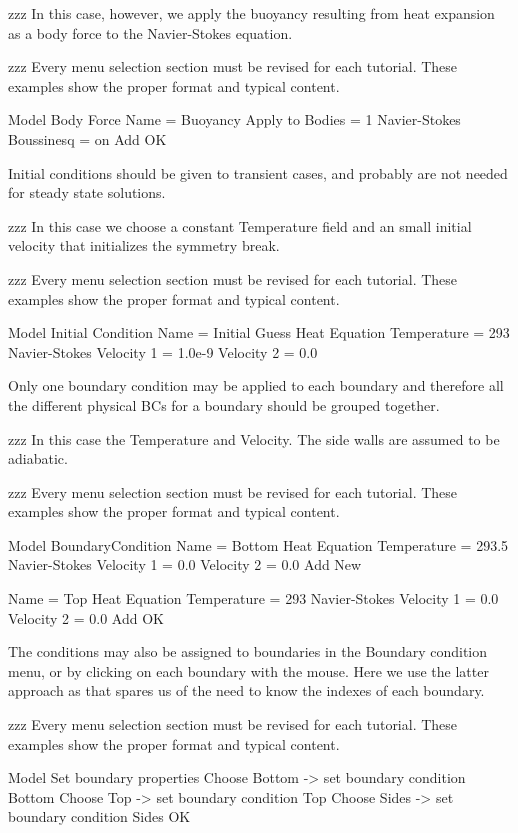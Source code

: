 zzz In this case, however, we apply the buoyancy resulting from heat expansion as a body force to the Navier-Stokes equation.

zzz Every menu selection section must be revised for each tutorial.  These examples show the proper format and typical content.

\ttbegin
Model
  Body Force
    Name = Buoyancy
    Apply to Bodies = 1
    Navier-Stokes
      Boussinesq = on
    Add 
    OK
\ttend    

Initial conditions should be given to transient cases, and probably are not needed for steady state solutions. 

zzz In this case we choose a constant Temperature field and an small initial velocity that initializes the symmetry break. 

zzz Every menu selection section must be revised for each tutorial.  These examples show the proper format and typical content.

\ttbegin
Model
  Initial Condition 
    Name = Initial Guess
    Heat Equation
      Temperature = 293
    Navier-Stokes
      Velocity 1 = 1.0e-9
      Velocity 2 = 0.0
\ttend

Only one boundary condition may be applied to each boundary and therefore all the different physical BCs for a boundary should be grouped together. 

zzz In this case the Temperature and Velocity. The side walls are assumed to be adiabatic.

zzz Every menu selection section must be revised for each tutorial.  These examples show the proper format and typical content.

\ttbegin
Model
  BoundaryCondition
    Name = Bottom
    Heat Equation
      Temperature = 293.5
    Navier-Stokes 
      Velocity 1 = 0.0
      Velocity 2 = 0.0
    Add
    New

    Name = Top
    Heat Equation
      Temperature = 293
    Navier-Stokes 
      Velocity 1 = 0.0
      Velocity 2 = 0.0
    Add
   OK 
\ttend   

The conditions may also be assigned to boundaries in the Boundary condition menu, or by clicking on each boundary with the mouse. Here we use the latter approach as that spares us of the need to know the indexes of each boundary.

zzz Every menu selection section must be revised for each tutorial.  These examples show the proper format and typical content.

\ttbegin
Model
  Set boundary properties
    Choose Bottom -> set boundary condition Bottom
    Choose Top -> set boundary condition Top
    Choose Sides -> set boundary condition Sides
   OK 
\ttend

